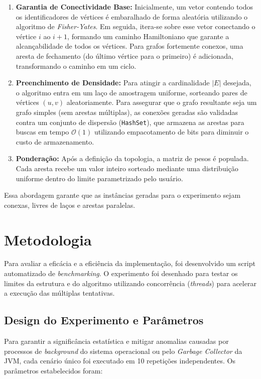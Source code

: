 \documentclass[12pt]{article}
\begin{document}
\begin{enumerate}
    \item \textbf{Garantia de Conectividade Base:} Inicialmente, um vetor contendo todos os identificadores de vértices é embaralhado de forma aleatória utilizando o algoritmo de \textit{Fisher-Yates}. Em seguida, itera-se sobre esse vetor conectando o vértice $i$ ao $i+1$, formando um caminho Hamiltoniano que garante a alcançabilidade de todos os vértices. Para grafos fortemente conexos, uma aresta de fechamento (do último vértice para o primeiro) é adicionada, transformando o caminho em um ciclo.
    
    \item \textbf{Preenchimento de Densidade:} Para atingir a cardinalidade $|E|$ desejada, o algoritmo entra em um laço de amostragem uniforme, sorteando pares de vértices $(u, v)$ aleatoriamente. Para assegurar que o grafo resultante seja um grafo simples (sem arestas múltiplas), as conexões geradas são validadas contra um conjunto de dispersão (\texttt{HashSet}), que armazena as arestas para buscas em tempo $\mathcal{O}(1)$ utilizando empacotamento de bits para diminuir o custo de armazenamento.
    
    \item \textbf{Ponderação:} Após a definição da topologia, a matriz de pesos é populada. Cada aresta recebe um valor inteiro sorteado mediante uma distribuição uniforme dentro do limite parametrizado pelo usuário.
\end{enumerate}

Essa abordagem garante que as instâncias geradas para o experimento sejam conexas, livres de laços e arestas paralelas.

\section{Metodologia} \label{metodologia}

Para avaliar a eficácia e a eficiência da implementação, foi desenvolvido um script automatizado de \textit{benchmarking}. O experimento foi desenhado para testar os limites da estrutura e do algoritmo utilizando concorrência (\textit{threads}) para acelerar a execução das múltiplas tentativas.

\subsection{Design do Experimento e Parâmetros}

Para garantir a significância estatística e mitigar anomalias causadas por processos de \textit{background} do sistema operacional ou pelo \textit{Garbage Collector} da JVM, cada cenário único foi executado em 10 repetições independentes. Os parâmetros estabelecidos foram:
\end{document}
